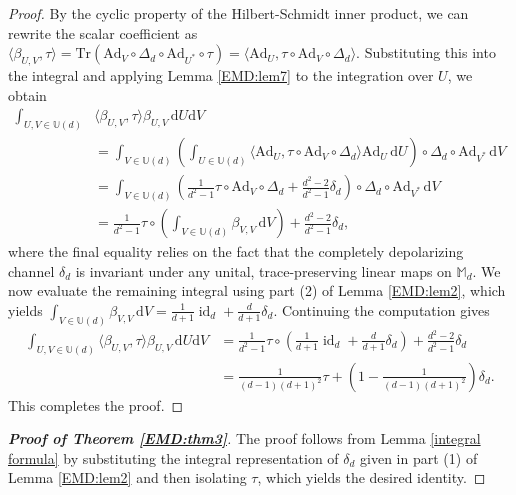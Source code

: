 \documentclass[11pt,reqno]{amsart}
\theoremstyle{definition}
\theoremstyle{plain}
\theoremstyle{remark}
\numberwithin{equation}{section}%
\begin{document}
\begin{proof}
		By the cyclic property of the Hilbert-Schmidt inner product, we can rewrite the scalar coefficient as $
		\langle \beta_{U,V}, \tau \rangle = \text{Tr}(\text{Ad}_V \circ \Delta_d \circ \text{Ad}_{U^*} \circ \tau) = \langle \text{Ad}_U, \tau \circ \text{Ad}_V \circ \Delta_d \rangle$. Substituting this into the integral and applying Lemma \ref{EMD:lem7} to the integration over $U$, we obtain
		\begin{align*}
			\int_{U,V \in \mathbb{U}(d)} &\langle \beta_{U,V}, \tau \rangle \beta_{U,V} \, \mathrm{d}U \mathrm{d}V \\
			&= \int_{V \in \mathbb{U}(d)} \left( \int_{U \in \mathbb{U}(d)} \langle \text{Ad}_U, \tau \circ \text{Ad}_V \circ \Delta_d \rangle \text{Ad}_U \, \mathrm{d}U \right) \circ \Delta_d \circ \text{Ad}_{V^*} \, \mathrm{d}V \\
			&= \int_{V \in \mathbb{U}(d)} \left( \frac{1}{d^2-1} \tau \circ \text{Ad}_V \circ \Delta_d + \frac{d^2-2}{d^2-1} \delta_d \right) \circ \Delta_d \circ \text{Ad}_{V^*} \, \mathrm{d}V \\
			&= \frac{1}{d^2-1} \tau \circ \left( \int_{V \in \mathbb{U}(d)} \beta_{V,V} \, \mathrm{d}V \right) + \frac{d^2-2}{d^2-1} \delta_d,
		\end{align*}
		where the final equality relies on the fact that the completely depolarizing channel $\delta_d$ is invariant under any unital, trace-preserving linear maps on $\mathbb{M}_d$. We now evaluate the remaining integral using part (2) of Lemma \ref{EMD:lem2}, which yields $\int_{V\in \mathbb{U}(d)}\beta_{V,V}\,\mathrm{d}V=\frac{1}{d+1}\operatorname{id}_d + \frac{d}{d+1}\delta_d$. Continuing the computation gives
		\begin{align*}
			\int_{U,V \in \mathbb{U}(d)} \langle \beta_{U,V}, \tau \rangle \beta_{U,V} \, \mathrm{d}U \mathrm{d}V &= \frac{1}{d^2-1} \tau \circ \left( \frac{1}{d+1} \operatorname{id}_d + \frac{d}{d+1} \delta_d \right) + \frac{d^2-2}{d^2-1} \delta_d \\
			&= \frac{1}{(d-1)(d+1)^2} \tau + \left( 1 - \frac{1}{(d-1)(d+1)^2} \right) \delta_d.
		\end{align*}
		This completes the proof.
\end{proof}



\begin{proof}[\textbf{Proof of Theorem \ref{EMD:thm3}}]
	  The proof follows from Lemma \ref{integral formula} by substituting the integral representation of $\delta_d$ given in part (1) of Lemma \ref{EMD:lem2} and then isolating $\tau$, which yields the desired identity.
\end{proof}
\end{document}
